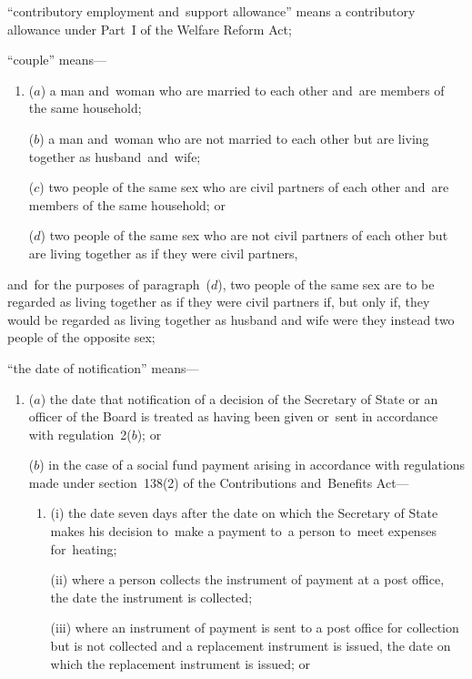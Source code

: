 \documentclass[12pt,a4paper]{article}
\begin{document}
\begin{enumerate}
“contributory employment and~support allowance” means a contributory allowance under Part~I of the Welfare Reform Act;

“couple” means—
\begin{enumerate}\item[]
($a$) 
a man and~woman who are married to each other and~are members of the same household;

($b$) 
a man and~woman who are not married to each other but are living together as husband~and~wife;

($c$) 
two people of the same sex who are civil partners of each other and~are members of the same household; or

($d$) 
two people of the same sex who are not civil partners of each other but are living together as if they were civil partners,
\end{enumerate}
and~for the purposes of paragraph~($d$), two people of the same sex are to be regarded as living together as if they were civil partners if, but only if, they would be regarded as living together as husband and wife were they instead two people of the opposite sex; 

“the date of notification” means—
\begin{enumerate}\item[]
($a$) the date that notification of a decision of the Secretary of State 
or an officer of the Board  %
is treated as having been given or~sent in accordance with regulation~2($b$); or

($b$) in the case of a social fund payment arising in accordance with regulations made under section~138(2) of the Contributions and~Benefits Act—
\begin{enumerate}\item[]
(i) the date seven days after the date on which the Secretary of State makes his decision to~make a payment to~a person to~meet expenses for~heating;

(ii) where a person collects the instrument of payment at a post office, the date the instrument is collected;

(iii) where an instrument of payment is sent to a post office for collection but is not collected and a replacement instrument is issued, the date on which the replacement instrument is issued; or


\end{enumerate}
\end{enumerate}
\end{enumerate}
\end{document}
